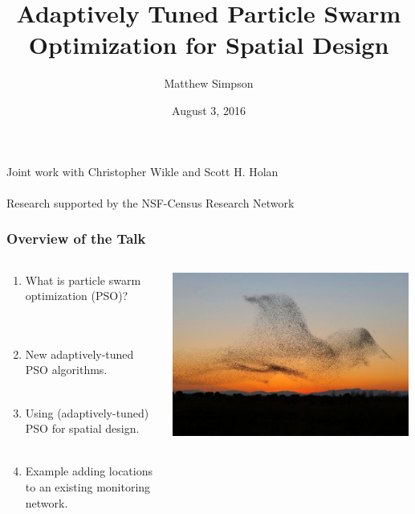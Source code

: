 \documentclass[xcolor=dvipsnames]{beamer}
\title[AT-PSO for Spatial Design]{Adaptively Tuned Particle Swarm Optimization for Spatial Design}
\author[Matt Simpson]{Matthew Simpson}
\institute[Mizzou Stat / SAS]{Department of Statistics, University of Missouri\\
                              SAS Institute, Inc.}
\date{August 3, 2016}
\begin{document}
\begin{frame}
\titlepage
\centering
{\scriptsize
Joint work with Christopher Wikle and Scott H. Holan\\~\\
Research supported by the NSF-Census Research Network}
\end{frame}

\begin{frame}
\frametitle{Overview of the Talk}
\begin{columns}
\begin{column}{0.5\textwidth}
\begin{enumerate}
\item What is particle swarm optimization (PSO)?\\
 \citep*{blum2008swarm, clerc2010particle, clerc2011spso}\\~\\
\item New adaptively-tuned PSO algorithms.\\~\\
\item Using (adaptively-tuned) PSO for spatial design.\\~\\
\item Example adding locations to an existing monitoring network.
\end{enumerate}
\end{column}
\begin{column}{0.5\textwidth}
\includegraphics[width = 0.99\textwidth]{birds3.jpg}
\end{column}
\end{columns}
\end{frame}
\end{document}
